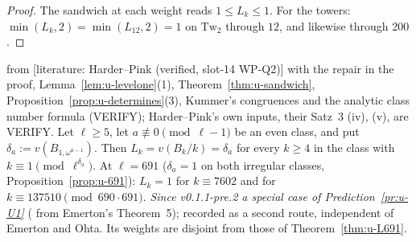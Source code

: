 \documentclass[11pt]{article}
\newcommand{\LIT}[1]{\textsf{[literature: #1]}}   %
\newcommand{\VERIFYloc}{\textsf{VERIFY}}          %
\begin{document}
\begin{proof}
The sandwich at each weight reads $1\le L_k\le1$. For the towers: $\min(L_k,2)=\min(L_{12},2)=1$ on $\mathrm{Tw}_2$ through $12$, and likewise through $200$.
\end{proof}

\begin{proposition}\label{prop:u-HP}
\PROVED{} from \LIT{Harder--Pink \cite[Satz~5, p.~92; \S4.2, pp.~92--93]{harder_pink} (verified, slot-14 WP-Q2)} with the repair in the
proof, Lemma~\ref{lem:u-levelone}(1), Theorem~\ref{thm:u-sandwich}, Proposition~\ref{prop:u-determines}(3), Kummer's congruences and the analytic
class number formula \cite[Thm.~4.17]{washington} (\VERIFYloc); Harder--Pink's own inputs, their Satz~3 (iv), (v), are \VERIFYloc. Let
$\ell\ge5$, let $a\not\equiv0\pmod{\ell-1}$ be an even class, and put $\delta_a:=v(B_{1,\omega^{a-1}})$. Then $L_k=v(B_k/k)=\delta_a$ for every
$k\ge4$ in the class with $k\equiv1\pmod{\ell^{\delta_a}}$. At $\ell=691$ ($\delta_a=1$ on both irregular classes, Proposition~\ref{prop:u-691}):
$L_k=1$ for $k\equiv7602$ and for $k\equiv137510\pmod{690\cdot691}$.
\emph{Since v0.1.1-pre.2 a special case of Prediction~\ref{pr:u-U1}} (\PROVED{} from Emerton's Theorem~5); recorded as a second route,
independent of Emerton and Ohta. Its weights are disjoint from those of Theorem~\ref{thm:u-L691}.
\end{proposition}
\end{document}
